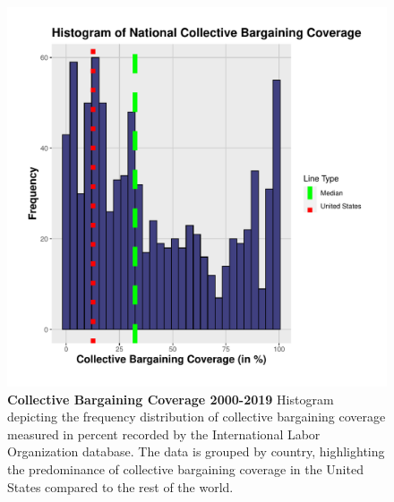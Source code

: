\documentclass[11pt]{article}\usepackage[]{graphicx}\usepackage[]{xcolor}
\newenvironment{knitrout}{}{} %
\begin{document}
\begin{figure}[h]
\centering
\begin{minipage}{0.7\linewidth}
\begin{knitrout}
\color{fgcolor}

{\centering \includegraphics[width=0.7\linewidth]{figure/CollectiveBargaining-1} 

}


\end{knitrout}
  \caption[Collective Bargaining Coverage]{\textbf {Collective Bargaining Coverage 2000-2019} Histogram depicting the frequency distribution of collective bargaining coverage measured in percent recorded by the International Labor Organization database. The data is grouped by country, highlighting the predominance of collective bargaining coverage in the United States compared to the rest of the world.}
  \label{fig:2.1}
  \end{minipage}
\end{figure}
\hspace{5pt}
\end{document}

